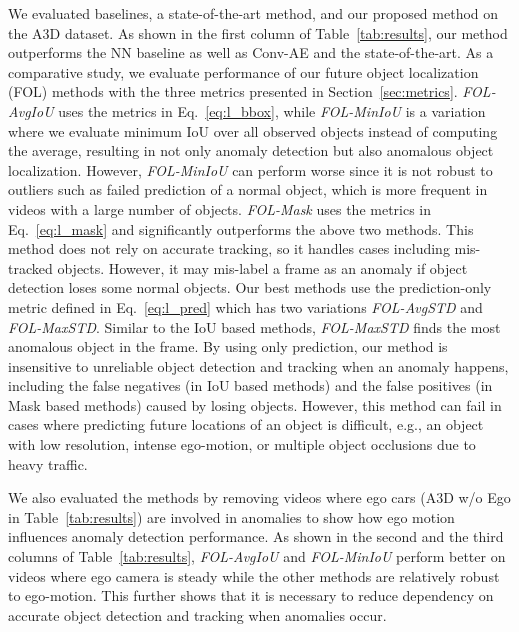 \documentclass[letterpaper, 10 pt, conference]{ieeeconf}
\theoremstyle{definition}
\theoremstyle{remark}
\begin{document}
\vspace{-5pt}
We evaluated baselines, a
state-of-the-art method, and our proposed method on the A3D dataset.
As shown in the first column of Table~\ref{tab:results}, our
method outperforms the NN baseline as well as Conv-AE and the state-of-the-art. As a comparative study, we evaluate
performance of our future object localization (FOL) methods with the three metrics presented in
Section~\ref{sec:metrics}. \textit{FOL-AvgIoU} uses the metrics in
Eq.~\eqref{eq:l_bbox}, while \textit{FOL-MinIoU} is a variation where we
evaluate minimum IoU over all observed objects instead of computing
the average, resulting in not only anomaly detection but also
anomalous object localization. However, \textit{FOL-MinIoU} can
perform worse since it is not robust to outliers such as failed
prediction of a normal object, which is more frequent in videos with a
large number of objects. \textit{FOL-Mask} uses the metrics in
Eq.~\eqref{eq:l_mask} and significantly outperforms the above two methods. This
method does not rely on accurate tracking, so it handles cases
including mis-tracked objects. However, it may mis-label a frame as an
anomaly if object detection loses some normal objects. Our best
methods use the prediction-only metric defined in
Eq.~\eqref{eq:l_pred} which has two variations \textit{FOL-AvgSTD}
and \textit{FOL-MaxSTD}. Similar to the IoU based methods, 
\textit{FOL-MaxSTD} finds the most anomalous object in the frame.
By using only prediction, our method is insensitive to
unreliable object detection and tracking when an anomaly happens,
including the false negatives (in IoU based methods) and the false
positives (in Mask based methods) caused by losing 
objects. However, this method can fail in cases where predicting future locations
of an object is difficult, e.g., an object with low resolution,
intense ego-motion, or multiple object occlusions due to heavy
traffic.

We also evaluated the methods by removing videos where ego cars 
(A3D w/o Ego in Table~\ref{tab:results})
are involved in anomalies to show how ego motion influences
anomaly detection performance. As shown in the second and the third
columns of Table~\ref{tab:results}, \textit{FOL-AvgIoU} and
\textit{FOL-MinIoU} perform better on videos where ego camera is steady
while the
other methods are relatively robust to ego-motion. This further
shows that it is necessary to reduce dependency on accurate object
detection and tracking when anomalies occur.
\end{document}
